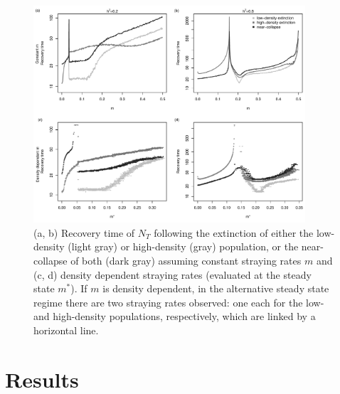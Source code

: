 \documentclass[twocolumn,preprintnumbers,amsmath,amssymb,superscriptaddress]{revtex4}
\begin{document}
\begin{figure}
  \captionsetup{justification=raggedright,
singlelinecheck=false
}
\centering
\includegraphics[width=0.9\textwidth]{figs2/fig_relax_comb.pdf}
\caption{
(a, b) Recovery time of $N_T$ following the extinction of either the low-density (light gray) or high-density (gray) population, or the near-collapse of both (dark gray) assuming constant straying rates $m$ and (c, d) density dependent straying rates (evaluated at the steady state $m^*$).
If $m$ is density dependent, in the alternative steady state regime there are two straying rates observed: one each for the low- and high-density populations, respectively, which are linked by a horizontal line.
} \label{fig:relax}
\end{figure}



\section{Results}

\end{document}
